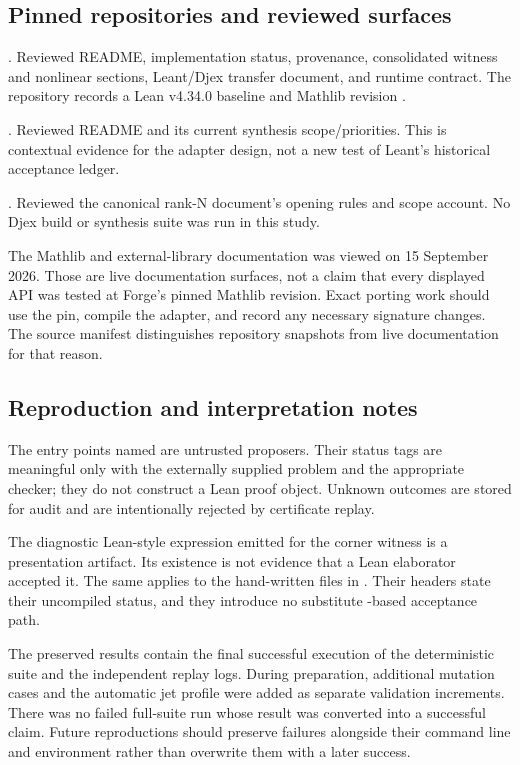 \subsection{Pinned repositories and reviewed surfaces}
\begin{description}[style=nextline,leftmargin=1.5em]
\item[Forge]
.
Reviewed README, implementation status, provenance, consolidated witness and nonlinear sections, Leant/Djex transfer document, and runtime contract. The repository records a Lean v4.34.0 baseline and Mathlib revision
.
\item[Leant]
.
Reviewed README and its current synthesis scope/priorities. This is contextual evidence for the adapter design, not a new test of Leant's historical acceptance ledger.
\item[Djex]
.
Reviewed the canonical rank-N document's opening rules and scope account. No Djex build or synthesis suite was run in this study.
\end{description}

The Mathlib and external-library documentation was viewed on 15 September 2026. Those are live documentation surfaces, not a claim that every displayed API was tested at Forge's pinned Mathlib revision. Exact porting work should use the pin, compile the adapter, and record any necessary signature changes. The source manifest distinguishes repository snapshots from live documentation for that reason.

\subsection{Reproduction and interpretation notes}
The entry points named  are untrusted proposers. Their status tags are meaningful only with the externally supplied problem and the appropriate checker; they do not construct a Lean proof object. Unknown outcomes are stored for audit and are intentionally rejected by certificate replay.

The diagnostic Lean-style expression emitted for the corner witness is a presentation artifact. Its existence is not evidence that a Lean elaborator accepted it. The same applies to the hand-written files in . Their headers state their uncompiled status, and they introduce no substitute -based acceptance path.

The preserved results contain the final successful execution of the deterministic suite and the independent replay logs. During preparation, additional mutation cases and the automatic jet profile were added as separate validation increments. There was no failed full-suite run whose result was converted into a successful claim. Future reproductions should preserve failures alongside their command line and environment rather than overwrite them with a later success.
